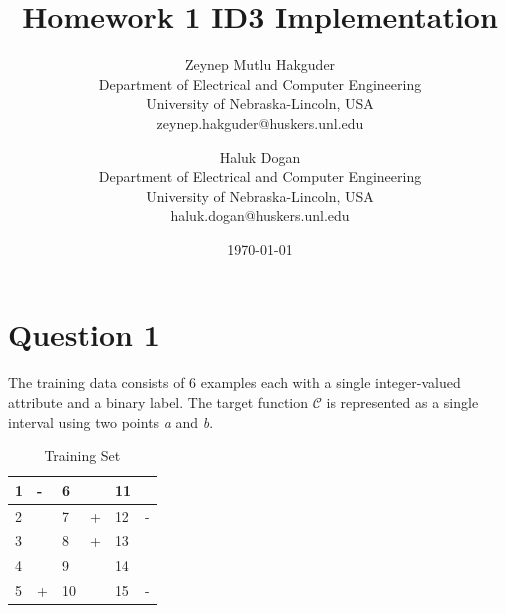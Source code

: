 \documentclass[12pt]{article}
\title{Homework 1 ID3 Implementation}
\author{
        Zeynep Mutlu Hakguder \\
                Department of Electrical and Computer Engineering\\
        University of Nebraska-Lincoln, USA\\
        zeynep.hakguder@huskers.unl.edu
            \and
        Haluk Dogan\\
        Department of Electrical and Computer Engineering\\
        University of Nebraska-Lincoln, USA\\
        haluk.dogan@huskers.unl.edu
}
\date{\today}
\begin{document}
\maketitle

\newpage
\tableofcontents

\newpage
\section{Question 1}
The training data consists of $6$ examples each with a single
integer-valued attribute and a binary label. The target function $\mathcal{C}$ is
represented as a single interval using two points \textit{a} and \textit{b}.

\begin{table}[H]
\centering
\begin{tabular}{|l|l||l|l||l|l|}
\hline
1 & - & 6  &   & 11 &   \\ \hline
2 &   & 7  & + & 12 & - \\ \hline
3 &   & 8  & + & 13 &   \\ \hline
4 &   & 9  &   & 14 &   \\ \hline
5 & + & 10 &   & 15 & - \\ \hline
\end{tabular}
\caption{Training Set}
\label{my-label}
\end{table}
\end{document}
